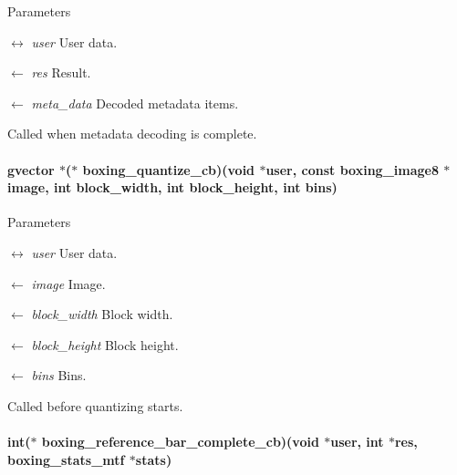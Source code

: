 \begin{DoxyParams}{Parameters}
\item[\mbox{$\leftrightarrow$} {\em user}]User data. \item[\mbox{$\leftarrow$} {\em res}]Result. \item[\mbox{$\leftarrow$} {\em meta\_\-data}]Decoded metadata items.\end{DoxyParams}
Called when metadata decoding is complete. \hypertarget{group__unboxer_gac0f9cec0fc7b0ad34eaf5bad8b017cf9}{
\paragraph[{boxing\_\-quantize\_\-cb}]{\setlength{\rightskip}{0pt plus 5cm}gvector $\ast$($\ast$ {\bf boxing\_\-quantize\_\-cb})(void $\ast$user, const boxing\_\-image8 $\ast$image, int block\_\-width, int block\_\-height, int bins)}\hfill}
\label{group__unboxer_gac0f9cec0fc7b0ad34eaf5bad8b017cf9}

\begin{DoxyParams}{Parameters}
\item[\mbox{$\leftrightarrow$} {\em user}]User data. \item[\mbox{$\leftarrow$} {\em image}]Image. \item[\mbox{$\leftarrow$} {\em block\_\-width}]Block width. \item[\mbox{$\leftarrow$} {\em block\_\-height}]Block height. \item[\mbox{$\leftarrow$} {\em bins}]Bins.\end{DoxyParams}
Called before quantizing starts. \hypertarget{group__unboxer_gae52c4aa9002423b4b7d1f15e2fe56f3f}{
\paragraph[{boxing\_\-reference\_\-bar\_\-complete\_\-cb}]{\setlength{\rightskip}{0pt plus 5cm}int($\ast$ {\bf boxing\_\-reference\_\-bar\_\-complete\_\-cb})(void $\ast$user, int $\ast$res, boxing\_\-stats\_\-mtf $\ast$stats)}\hfill}
\label{group__unboxer_gae52c4aa9002423b4b7d1f15e2fe56f3f}

